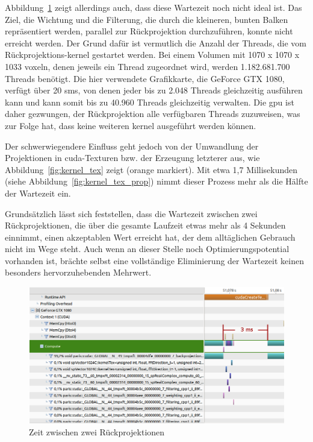 Abbildung~\ref{fig:kernel_wait} zeigt allerdings auch, dass diese Wartezeit noch nicht ideal ist. Das Ziel, die Wichtung
und die Filterung, die durch die kleineren, bunten Balken repräsentiert werden, parallel zur Rückprojektion
durchzuführen, konnte nicht erreicht werden. Der Grund dafür ist vermutlich die Anzahl der Threads, die vom
Rückprojektions-\gls{kernel} gestartet werden. Bei einem Volumen mit 1070 x 1070 x 1033 \gls{voxel}n, denen jeweils ein
Thread zugeordnet wird, werden 1.182.681.700 Threads benötigt. Die hier verwendete Grafikkarte, die
GeForce{\textregistered} GTX 1080, verfügt über 20 \gls{sm}s, von denen jeder bis zu 2.048 Threads gleichzeitig
ausführen kann und kann somit bis zu 40.960 Threads gleichzeitig verwalten. Die \gls{gpu} ist daher gezwungen, der
Rückprojektion alle verfügbaren Threads zuzuweisen, was zur Folge hat, dass keine weiteren \gls{kernel} ausgeführt
werden können.

Der schwerwiegendere Einfluss geht jedoch von der Umwandlung der Projektionen in \gls{cuda}-Texturen bzw. der Erzeugung
letzterer aus, wie Abbildung~\ref{fig:kernel_tex} zeigt (orange markiert). Mit etwa 1,7 Millisekunden (siehe
Abbildung~\ref{fig:kernel_tex_prop}) nimmt dieser Prozess mehr als die Hälfte der Wartezeit ein.

Grundsätzlich lässt sich feststellen, dass die Wartezeit zwischen zwei Rückprojektionen, die über die gesamte Laufzeit
etwas mehr als 4 Sekunden einnimmt, einen akzeptablen Wert erreicht hat, der dem alltäglichen Gebrauch nicht im Wege
steht. Auch wenn an dieser Stelle noch Optimierungspotential vorhanden ist, brächte selbst eine vollständige
Eliminierung der Wartezeit keinen besonders hervorzuhebenden Mehrwert.

\begin{figure}
    \includegraphics[width=\linewidth]{img/timeline_compute2}
    \caption{Zeit zwischen zwei Rückprojektionen}
    \label{fig:kernel_wait}
\end{figure}


